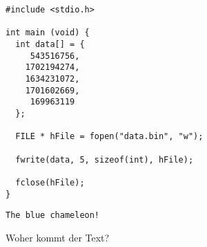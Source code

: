 \begin{frame}[fragile]
%
\begin{tcbraster}[raster columns=2,
                  raster equal height,
                  nobeforeafter
                 ]
\begin{codebox}
\begin{verbatim}
#include <stdio.h>

int main (void) {
  int data[] = {
     543516756,
    1702194274,
    1634231072,
    1701602669,
     169963119
  };

  FILE * hFile = fopen("data.bin", "w");

  fwrite(data, 5, sizeof(int), hFile);

  fclose(hFile);
}
\end{verbatim}
\end{codebox}
%
\begin{cmdbox}
\begin{verbatim}
The blue chameleon!
\end{verbatim}
\end{cmdbox}
\end{tcbraster}
%
\begin{center}
\Thus Woher kommt der Text?
\end{center}
%
\end{frame}


